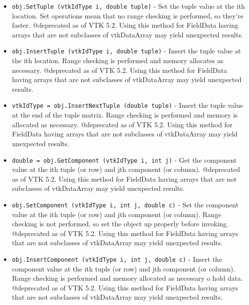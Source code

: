\begin{itemize}
\item  \verb|obj.SetTuple (vtkIdType i, double tuple)| -  Set the tuple value at the ith location. Set operations
 mean that no range checking is performed, so they're faster.
 @deprecated as of VTK 5.2. Using this method for FieldData
 having arrays that are not subclasses of vtkDataArray may
 yield unexpected results.

\item  \verb|obj.InsertTuple (vtkIdType i, double tuple)| -  Insert the tuple value at the ith location. Range checking is
 performed and memory allocates as necessary.
 @deprecated as of VTK 5.2. Using this method for FieldData
 having arrays that are not subclasses of vtkDataArray may
 yield unexpected results.

\item  \verb|vtkIdType = obj.InsertNextTuple (double tuple)| -  Insert the tuple value at the end of the tuple matrix. Range
 checking is performed and memory is allocated as necessary.
 @deprecated as of VTK 5.2. Using this method for FieldData
 having arrays that are not subclasses of vtkDataArray may
 yield unexpected results.

\item  \verb|double = obj.GetComponent (vtkIdType i, int j)| -  Get the component value at the ith tuple (or row) and jth component (or
 column).
 @deprecated as of VTK 5.2. Using this method for FieldData
 having arrays that are not subclasses of vtkDataArray may
 yield unexpected results.

\item  \verb|obj.SetComponent (vtkIdType i, int j, double c)| -  Set the component value at the ith tuple (or row) and jth component (or
 column).  Range checking is not performed, so set the object up properly
 before invoking.
 @deprecated as of VTK 5.2. Using this method for FieldData
 having arrays that are not subclasses of vtkDataArray may
 yield unexpected results.

\item  \verb|obj.InsertComponent (vtkIdType i, int j, double c)| -  Insert the component value at the ith tuple (or row) and jth component
 (or column).  Range checking is performed and memory allocated as
 necessary o hold data.
 @deprecated as of VTK 5.2. Using this method for FieldData
 having arrays that are not subclasses of vtkDataArray may
 yield unexpected results.

\end{itemize}

